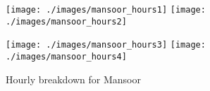\begin{figure}[H]
	\centering
	\texttt{[image: ./images/mansoor\_hours1]}
	\texttt{[image: ./images/mansoor\_hours2]}
\end{figure}
\begin{figure}[H]
	\centering
	\texttt{[image: ./images/mansoor\_hours3]}
	\texttt{[image: ./images/mansoor\_hours4]}
	\caption{Hourly breakdown for Mansoor}
\end{figure}
